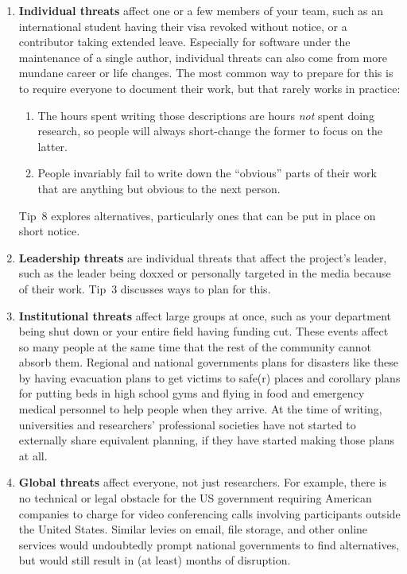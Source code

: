 \documentclass[10pt,letterpaper]{article}
\begin{document}
\begin{enumerate}
\item
  \textbf{Individual threats} affect one or a few members of your team,
  such as an international student having their visa revoked without notice, or a contributor taking extended leave.
  Especially for software under the maintenance of a single author,
  individual threats can also come from more mundane career or life changes.
  The most common way to prepare for this is to require everyone to document their work,
  but that rarely works in practice:
  \begin{enumerate}
  \item
    The hours spent writing those descriptions are hours \emph{not} spent doing research,
    so people will always short-change the former to focus on the latter.
  \item
    People invariably fail to write down the ``obvious'' parts of their work
    that are anything but obvious to the next person.
  \end{enumerate}
  Tip~8 explores alternatives,
  particularly ones that can be put in place on short notice.

\item
  \textbf{Leadership threats} are individual threats that affect the project's leader,
  such as the leader being doxxed or personally targeted in the media because of their work.
  Tip~3 discusses ways to plan for this.

\item
  \textbf{Institutional threats} affect large groups at once,
  such as your department being shut down
  or your entire field having funding cut.
  These events affect so many people at the same time
  that the rest of the community cannot absorb them.
  Regional and national governments plans for disasters like these
  by having evacuation plans to get victims to safe(r) places
  and corollary plans for putting beds in high school gyms
  and flying in food and emergency medical personnel to help people when they arrive.
  At the time of writing,
  universities and researchers' professional societies have not started to externally share equivalent planning, if they have started making those plans at all.

\item
  \textbf{Global threats} affect everyone,
  not just researchers.
  For example,
  there is no technical or legal obstacle for the US government
  requiring American companies to charge for video conferencing calls
  involving participants outside the United States.
  Similar levies on email,
  file storage,
  and other online services would undoubtedly prompt national governments to find alternatives,
  but would still result in (at least) months of disruption.

\end{enumerate}
\end{document}
